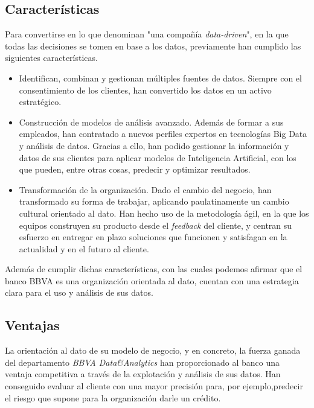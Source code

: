 \documentclass{article}
\begin{document}
\subsection{Características}
Para convertirse en lo que denominan "una compañía \textit{data-driven}", en la que todas las decisiones se tomen en base a los datos, previamente han cumplido las siguientes características.

\begin{itemize}
\item Identifican, combinan y gestionan múltiples fuentes de datos. Siempre con el consentimiento de los clientes, han convertido los datos en un activo estratégico.
\item Construcción de modelos de análisis avanzado. Además de formar a sus empleados, han contratado a nuevos perfiles expertos en tecnologías Big Data y análisis de datos. Gracias a ello, han podido gestionar la información y datos de sus clientes para aplicar modelos de Inteligencia Artificial, con los que pueden, entre otras cosas, predecir y optimizar resultados.
\item Transformación de la organización. Dado el cambio del negocio, han transformado su forma de trabajar, aplicando paulatinamente un cambio cultural orientado al dato. Han hecho uso de la metodología ágil, en la que los equipos construyen su producto desde el \textit{feedback} del cliente, y centran su esfuerzo en entregar en plazo soluciones que funcionen y satisfagan en la actualidad y en el futuro al cliente.

\end{itemize}

Además de cumplir dichas características, con las cuales podemos afirmar que el banco BBVA es una organización orientada al dato, cuentan con una estrategia clara para el uso y análisis de sus datos.

\subsection{Ventajas}

La orientación al dato de su modelo de negocio, y en concreto, la fuerza ganada del departamento \textit{BBVA Data\&Analytics} han proporcionado al banco una ventaja competitiva a través de la explotación y análisis de sus datos. Han conseguido evaluar al cliente con una mayor precisión para, por ejemplo,predecir el riesgo que supone para la organización darle un crédito.
\end{document}
